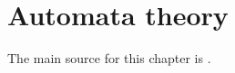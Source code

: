 

\setcounter{section}{1}
\setcounter{subsection}{0}
\setcounter{dfn}{10}

\chapter{Automata theory}
The main source for this chapter is \cite{HU79}.

